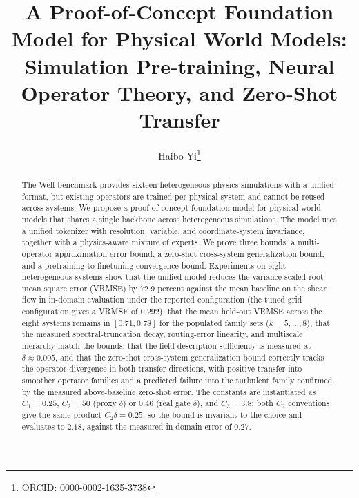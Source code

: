 \documentclass[preprint,12pt]{elsarticle}
\begin{document}
\begin{frontmatter}

\title{A Proof-of-Concept Foundation Model for Physical World Models: Simulation Pre-training, Neural Operator Theory, and Zero-Shot Transfer}

\author{Haibo Yi\footnote{ORCID: 0000-0002-1635-3738}}

\begin{abstract}
The Well benchmark provides sixteen heterogeneous physics simulations with a unified format, but existing operators are trained per physical system and cannot be reused across systems. We propose a proof-of-concept foundation model for physical world models that shares a single backbone across heterogeneous simulations. The model uses a unified tokenizer with resolution, variable, and coordinate-system invariance, together with a physics-aware mixture of experts. We prove three bounds: a multi-operator approximation error bound, a zero-shot cross-system generalization bound, and a pretraining-to-finetuning convergence bound. Experiments on eight heterogeneous systems show that the unified model reduces the variance-scaled root mean square error (VRMSE) by 72.9 percent against the mean baseline on the shear flow in in-domain evaluation under the reported configuration (the tuned grid configuration gives a VRMSE of $0.292$), that the mean held-out VRMSE across the eight systems remains in $[0.71,0.78]$ for the populated family sets ($k=5,\dots,8$), that the measured spectral-truncation decay, routing-error linearity, and multiscale hierarchy match the bounds, that the field-description sufficiency is measured at $\delta\approx0.005$, and that the zero-shot cross-system generalization bound correctly tracks the operator divergence in both transfer directions, with positive transfer into smoother operator families and a predicted failure into the turbulent family confirmed by the measured above-baseline zero-shot error. The constants are instantiated as $C_1=0.25$, $C_2=50$ (proxy $\delta$) or $0.46$ (real gate $\delta$), and $C_3=3.8$; both $C_2$ conventions give the same product $C_2\delta=0.25$, so the bound is invariant to the choice and evaluates to $2.18$, against the measured in-domain error of $0.27$.
\end{abstract}


\end{frontmatter}
\end{document}
